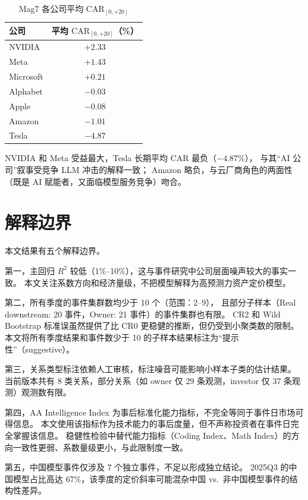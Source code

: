 \documentclass[11pt,fontset=fandol,a4paper]{ctexart}
\begin{document}
\begin{table}[htbp]
\centering
\caption{Mag7 各公司平均 $\text{CAR}_{[0,+20]}$}
\label{tab:mag7}
\small
\begin{tabular}{lc}
\toprule
公司 & 平均 $\text{CAR}_{[0,+20]}$（\%） \\
\midrule
NVIDIA   & \textbf{$+2.33$} \\
Meta     & $+1.43$ \\
Microsoft & $+0.21$ \\
Alphabet  & $-0.03$ \\
Apple    & $-0.08$ \\
Amazon   & $-1.01$ \\
Tesla    & \textbf{$-4.87$} \\
\bottomrule
\end{tabular}
\end{table}

NVIDIA 和 Meta 受益最大，Tesla 长期平均 CAR 最负（$-4.87\%$），
与其``AI 公司''叙事受竞争 LLM 冲击的解释一致；
Amazon 略负，与云厂商角色的两面性（既是 AI 赋能者，又面临模型服务竞争）吻合。

\section{解释边界}

本文结果有五个解释边界。

第一，主回归 $R^2$ 较低（1\%--10\%），这与事件研究中公司层面噪声较大的事实一致。
本文关注系数方向和经济量级，不把模型解释为高预测力资产定价模型。

第二，所有季度的事件集群数均少于 10 个（范围：2--9），
且部分子样本（Real downstream: 20 事件，Owner: 21 事件）的事件集群也有限。
CR2 和 Wild Bootstrap 标准误虽然提供了比 CR0 更稳健的推断，但仍受到小聚类数的限制。
本文将所有季度结果和事件数少于 10 的子样本结果标注为``提示性''（suggestive）。

第三，关系类型标注依赖人工审核，标注噪音可能影响小样本子类的估计结果。
当前版本共有 8 类关系，部分关系（如 owner 仅 29 条观测，investor 仅 37 条观测）观测数有限。

第四，AA Intelligence Index 为事后标准化能力指标，不完全等同于事件日市场可得信息。
本文使用该指标作为技术能力的事后度量，但不声称投资者在事件日完全掌握该信息。
稳健性检验中替代能力指标（Coding Index、Math Index）的方向一致性更弱、系数量级更小，与此限制度一致。

第五，中国模型事件仅涉及 7 个独立事件，不足以形成独立结论。
2025Q3 的中国模型占比高达 67\%，该季度的定价斜率可能混杂中国 vs.\ 非中国模型事件的结构性差异。
\end{document}
